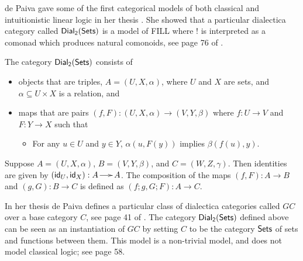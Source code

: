 de Paiva gave some of the first categorical models of both classical
and intuitionistic linear logic in her thesis \cite{dePaiva:1988}. She
showed that a particular dialectica category called $\mathsf{Dial_2}(\mathsf{Sets})$ is a model
of FILL where $!$ is interpreted as a comonad which produces natural
comonoids, see page 76 of \cite{dePaiva:1988}.
\begin{definition}
  \label{def:dial2sets}
  The category $\mathsf{Dial_2}(\mathsf{Sets})$ consists of 
  \begin{itemize}
  \item objects that are triples, $A = (U,X,\alpha)$, where $U$ and
    $X$ are sets, and $\alpha \subseteq U \times X$ is a relation, and
  \item maps that are pairs $(f,F) : (U,X,\alpha) \to (V,Y,\beta)$
    where $f : U \to V$ and $F : Y \to X$ such that
    \begin{itemize}
    \item For any $u \in U$ and $y \in Y$, $\alpha(u,F(y))$ implies $\beta(f(u),y)$.
    \end{itemize}
  \end{itemize}
  Suppose $A = (U,X,\alpha)$, $B = (V,Y,\beta)$, and
  $C = (W,Z,\gamma)$.  Then identities are given by
  $(\mathsf{id}_U,\mathsf{id}_X) : A \to A$.  The composition of the maps
  $(f,F) : A \to B$ and $(g, G) : B \to C$ is defined as
  $(f;g,G;F) : A \to C$.
\end{definition}
In her thesis de Paiva defines a particular class of dialectica
categories called $GC$ over a base category $C$, see page 41 of
\cite{dePaiva:1988}.  The category $\mathsf{Dial_2}(\mathsf{Sets})$ defined above can be seen
as an instantiation of $GC$ by setting $C$ to be the category $\mathsf{Sets}$
of sets and functions between them.  This model is a non-trivial
model, and does not model classical logic; see \cite{dePaiva:1988}
page 58.

